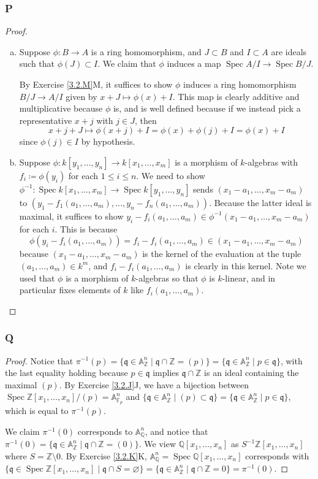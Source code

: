 \documentclass{article}
\newcommand{\A}{\mathbb{A}}
\newcommand{\Z}{\mathbb{Z}}
\newcommand{\Q}{\mathbb{Q}}
\newcommand{\F}{\mathbb{F}}
\newcommand{\frkq}{\mathfrak{q}}
\DeclareMathOperator{\Spec}{\mathrm{Spec}}
\let\emptyset\varnothing
\begin{document}
\subsubsection{P}\label{3.2.P}
\begin{proof}
    \begin{enumerate}[(a)]
        \item Suppose $\phi:B\to A$ is a ring homomorphism, and $J\subset B$ and $I\subset A$ are ideals such that $\phi(J)\subset I$. We claim that $\phi$ induces a map $\Spec A/I\to \Spec B/J$.

        By Exercise \ref{3.2.M}M, it suffices to show $\phi$ induces a ring homomorphism $B/J\to A/I$ given by $x+J\mapsto \phi(x)+I$. This map is clearly additive and multiplicative because $\phi$ is, and is well defined because if we instead pick a representative $x+j$ with $j\in J$, then
        \[
        x+j+J\mapsto \phi(x+j)+I = \phi(x)+\phi(j)+I=\phi(x)+I
        \]
        since $\phi(j)\in I$ by hypothesis.
        \item Suppose $\phi:k[y_1,\dots,y_n]\to k[x_1,\dots,x_m]$ is a morphism of $k$-algebras with $f_i\coloneqq \phi(y_i)$ for each $1\le i \le n$. We need to show $\phi^{-1}:\Spec k[x_1,\dots,x_m]\to \Spec k[y_1,\dots,y_n]$ sends $(x_1-a_1,\dots,x_m-a_m)$ to $(y_1-f_1(a_1,\dots,a_m),\dots,y_n-f_n(a_1,\dots,a_m))$. Because the latter ideal is maximal, it suffices to show $y_i-f_i(a_1,\dots,a_m)\in \phi^{-1}(x_1-a_1,\dots,x_m-a_m)$ for each $i$. This is because
        \[
        \phi(y_i-f_i(a_1,\dots,a_m))=f_i-f_i(a_1,\dots,a_m) \in (x_1-a_1,\dots,x_m-a_m)
        \]
        because $(x_1-a_1,\dots,x_m-a_m)$ is the kernel of the evaluation at the tuple $(a_1,\dots,a_m)\in k^m$, and $f_i-f_i(a_1,\dots,a_m)$ is clearly in this kernel. Note we used that $\phi$ is a morphism of $k$-algebras so that $\phi$ is $k$-linear, and in particular fixes elements of $k$ like $f_i(a_1,\dots,a_m)$.
    \end{enumerate}
\end{proof}
\subsubsection{Q}\label{3.2.Q}
\begin{proof}
    Notice that $\pi^{-1}(p)=\{\frkq \in \A^n_\Z \mid \frkq \cap \Z = (p)\}=\{\frkq \in \A^n_\Z \mid p\in \frkq\}$, with the last equality holding because $p\in \frkq$ implies $\frkq\cap \Z$ is an ideal containing the maximal $(p)$. By Exercise \ref{3.2.J}J, we have a bijection between $\Spec \Z[x_1,\dots,x_n]/(p)=\A^n_{\F_p}$ and $\{ \frkq \in \A^n_\Z \mid (p)\subset \frkq\}=\{ \frkq \in \A^n_\Z \mid p\in \frkq\}$, which is equal to $\pi^{-1}(p)$.

    We claim $\pi^{-1}(0)$ corresponds to $\A^n_\Q$, and notice that $\pi^{-1}(0)=\{\frkq \in \A^n_\Z \mid \frkq \cap \Z = (0)\}$. We view $\Q[x_1,\dots,x_n]$ as $S^{-1}\Z[x_1,\dots,x_n]$ where $S=\Z\setminus 0$. By Exercise \ref{3.2.K}K, $\A^n_\Q = \Spec \Q[x_1,\dots,x_n]$ corresponds with $\{\frkq \in \Spec \Z[x_1,\dots,x_n]\mid \frkq \cap S = \emptyset \} = \{\frkq \in \A^n_\Z \mid \frkq \cap \Z = 0 \} = \pi^{-1}(0)$.
\end{proof}
\end{document}
